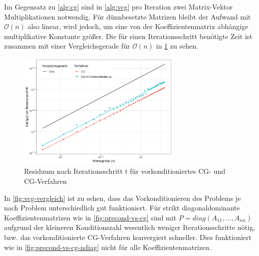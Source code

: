 \documentclass[12pt,a4paper]{scrartcl}
\numberwithin{equation}{section}
\numberwithin{myalgctr}{section}
\numberwithin{mytheoremctr}{subsection}
\numberwithin{mykorollarctr}{subsection}
\numberwithin{mylemmactr}{subsection}
\numberwithin{mybeispielctr}{subsection}
\begin{document}
	Im Gegensatz zu \cref{alg:cg}  sind in \cref{alg:vcg} pro Iteration zwei Matrix-Vektor Multiplikationen notwendig. F\"ur d\"unnbesetzte Matrizen bleibt der Aufwand mit $\mathcal{O}(n)$ also linear, wird jedoch, um eine  von der Koeffizientenmatrix abh\"angige multiplikative Konstante gr\"o\ss er. Die f\"ur einen Iterationsschritt ben\"otigte Zeit ist zusammen mit einer Vergleichsgerade f\"ur $\mathcal{O}(n)$ in \cref{fig:precond-vs-cg-complexity} zu sehen. 
	
	\begin{figure}[H]
		\begin{center}
			\includegraphics[width=0.7\textwidth]{../plots/precond-vs-cg-complexity.png}
		\end{center}
		\caption{Residuum nach Iterationsschritt $t$ f\"ur vorkonditioniertes CG- und CG-Verfahren }
		\label{fig:precond-vs-cg-complexity}	
	\end{figure}
	
	In \cref{fig:vcg-vergleich} ist zu sehen, dass das Vorkonditionieren des Problems je nach Problem unterschiedlich gut funktioniert.
	F\"ur strikt diagonaldominante Koeffizientenmatrizen wie in \cref{fig:precond-vs-cg} sind mit $P = diag(A_{11}, \ldots, A_{nn})$ aufgrund der kleineren Konditionszahl wesentlich weniger Iterationsschritte n\"otig, bzw. das vorkonditionierte CG-Verfahren konvergiert schneller. Dies funktioniert wie in \cref{fig:precond-vs-cg-ndiag} nicht f\"ur alle Koeffizientenmatrizen.
		
\end{document}
